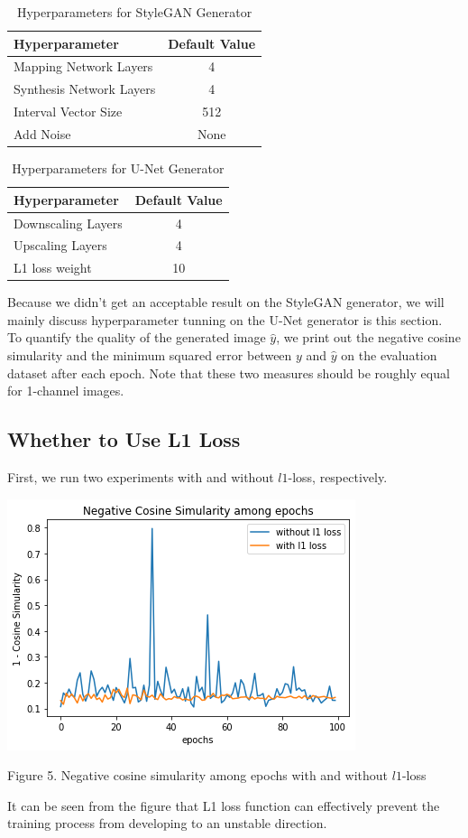 \documentclass[letterpaper]{article}
\begin{document}
\begin{table}[h]
    \centering
    \begin{tabular}{|l|c|}
        \hline
        Hyperparameter&Default Value\\
        \hline
        Mapping Network Layers&4\\
        Synthesis Network Layers&4\\
        Interval Vector Size&512\\
        Add Noise&None\\
        \hline
    \end{tabular}
    \caption{Hyperparameters for StyleGAN Generator}
\end{table}

\begin{table}[h]
    \centering
    \begin{tabular}{|l|c|}
        \hline
        Hyperparameter&Default Value\\
        \hline
        Downscaling Layers&4\\
        Upscaling Layers&4\\
        L1 loss weight&10\\
        \hline
    \end{tabular}
    \caption{Hyperparameters for U-Net Generator}
\end{table}

Because we didn't get an acceptable result on the StyleGAN generator, we will mainly discuss hyperparameter tunning on the U-Net generator is this section.
\\
To quantify the quality of the generated image $\hat{y}$, we print out the negative cosine simularity and the minimum squared error between $y$ and $\hat{y}$ on the evaluation dataset after each epoch. Note that these two measures should be roughly equal for 1-channel images.

\subsection{Whether to Use L1 Loss}
First, we run two experiments with and without $l1$-loss, respectively.
\begin{center}
    \includegraphics[width=.5\textwidth]{./report-fig-hp-1.png}

    Figure 5. Negative cosine simularity among epochs with and without $l1$-loss
\end{center}
It can be seen from the figure that L1 loss function can effectively prevent the training process from developing to an unstable direction.
\end{document}
